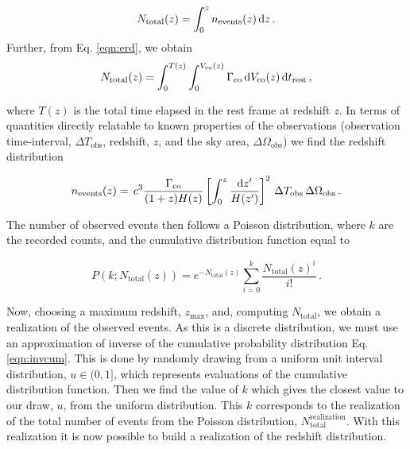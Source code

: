 \begin{equation}\label{eqn:total_dist}
N_{\mathrm{total}}(z) = \int_0^{z} n_{\mathrm{events}}(z) \, \mathrm{d} z\,.
\end{equation}
Further, from Eq. \ref{eqn:erd}, we obtain
\begin{equation}
N_{\mathrm{ total}}(z) = \int_0^{T (z)} \int_0^{V_{\mathrm{co}}(z)}  \Gamma_{\mathrm{co}} \, \mathrm{d} V_{\mathrm{co}}(z) \,\mathrm{d} t_{\mathrm{rest}} \, ,
\end{equation}

where $T(z)$ is the total time elapsed in the rest frame at redshift $z$. In terms of quantities directly relatable to known properties of the observations (observation time-interval, $\Delta T_{\mathrm{obs}}$, redshift, $z$, and the sky area, $\Delta \Omega_{\mathrm{obs}}$) we find the redshift distribution

\begin{align}\label{eqn:reddist}
n_{\mathrm{events}}(z) = \, c^3  \frac{\Gamma_{\mathrm{co}}}{(1+z)H(z)} \left[\int^{z}_0 \frac{\mathrm{d} z'}{H(z')} \right]^2 \, \Delta T_{\mathrm{obs}} \, \Delta \Omega_{\mathrm{obs}}\,.
\end{align}

The number of observed events then follows a Poisson distribution, where $k$ are the recorded counts, and the cumulative distribution function equal to

\begin{equation}\label{eqn:invcum}
P(k;N_{\mathrm{total}}(z)) =e^{-N_{\mathrm{ total}}(z)} \sum_{i=0}^k \frac{N_{\mathrm{ total}}(z)^i}{i!}\,.
\end{equation}

Now, choosing a maximum redshift, $z_{\mathrm{max}}$, and, computing $N_{\mathrm{ total}}$, we obtain a realization of the observed events. As this is a discrete distribution, we must use an approximation of inverse of the cumulative probability distribution Eq. \ref{eqn:invcum}. This is done by randomly drawing from a uniform unit interval distribution, $u\in(0,1]$, which represents evaluations of the cumulative distribution function. Then we find the value of $k$ which gives the closest value to our draw, $u$, from the uniform distribution. This $k$ corresponds to the realization of the total number of events from the Poisson distribution, $N_{\mathrm{ total}}^{\mathrm{realization}}$. With this realization it is now possible to build a realization of the redshift distribution.


